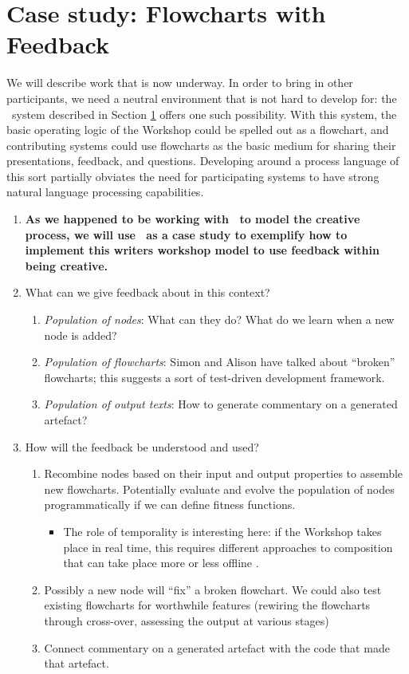 \section{Case study: Flowcharts with Feedback} \label{sec:implementation}

We will describe work that is now underway.  In order
to bring in other participants, we need a neutral environment that is
not hard to develop for: the \Fw\ system described in Section
\ref{sec:implementation} offers one such possibility.  With this
system, the basic operating logic of the Workshop could be spelled out
as a flowchart, and contributing systems could use flowcharts as the
basic medium for sharing their presentations, feedback, and questions.
Developing around a process language of this sort partially obviates
the need for participating systems to have strong natural language
processing capabilities.

\begin{enumerate}[start=3]
\item \textbf{As we happened to be working with \Fw\ to model the
  creative process, we will use \Fw\ as a case study to exemplify how
  to implement this writers workshop model to use feedback within
  being creative.}
\item[] What can we give feedback about in this context?
\begin{enumerate}
\item \emph{Population of nodes}: What can they do?  What do we learn when a
  new node is added?
\item \emph{Population of flowcharts}: Simon and Alison have talked
  about ``broken'' flowcharts; this suggests a sort of test-driven
  development framework.
\item \emph{Population of output texts}: How to generate commentary on
  a generated artefact?
\end{enumerate}
\item[] How will the feedback be understood and used?
\begin{enumerate}
\item Recombine nodes based on their input and output properties to
  assemble new flowcharts.  Potentially evaluate and evolve the
  population of nodes programmatically if we can define fitness
  functions.
\begin{itemize}
\item The role of temporality is interesting here: if the Workshop
  takes place in real time, this requires different approaches to
  composition that can take place more or less offline \cite{perez2013rolling}.
\end{itemize}
\item Possibly a new node will ``fix'' a broken flowchart.  We could also test existing flowcharts for worthwhile features (rewiring the flowcharts through cross-over, assessing the output at various stages)
\item Connect commentary on a generated artefact with the code that
  made that artefact.
\end{enumerate}
\end{enumerate}
